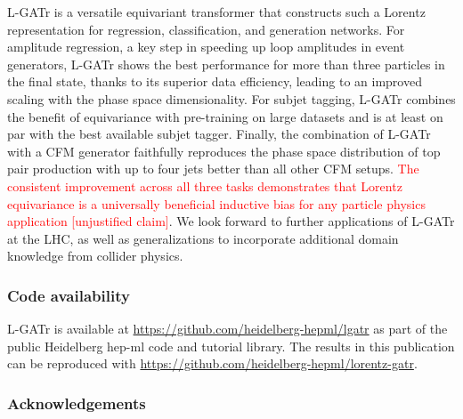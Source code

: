 \documentclass[submission, Phys]{SciPost}
\begin{document}
L-GATr is a versatile  equivariant transformer that constructs such a Lorentz representation for regression, classification, and generation networks.
For amplitude regression, a key step in speeding up loop amplitudes in event generators, L-GATr shows the best performance for more than three particles in the final state, thanks to its superior data efficiency, leading to an improved scaling with the phase space dimensionality.
For subjet tagging, L-GATr combines the benefit of equivariance with pre-training on large datasets and is at least on par with the best available subjet tagger.
Finally, the combination of L-GATr with a CFM generator faithfully reproduces the phase space distribution of top pair production with up to four jets better than all other CFM setups.
%
\textcolor{red}{The consistent improvement across all three tasks demonstrates that Lorentz equivariance is a universally beneficial inductive bias for any particle physics application [unjustified claim]}. We look forward to further applications of L-GATr at the LHC, as well as generalizations to incorporate additional domain knowledge from collider physics.

\subsubsection*{Code availability}

L-GATr is available at \url{https://github.com/heidelberg-hepml/lgatr} as part of the public Heidelberg hep-ml code and tutorial library. The results in this publication can be reproduced with \url{https://github.com/heidelberg-hepml/lorentz-gatr}.

\subsubsection*{Acknowledgements}
\end{document}
